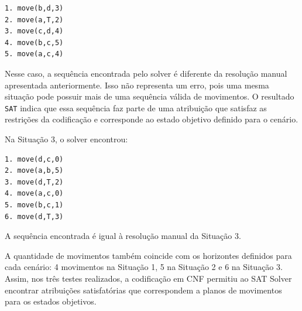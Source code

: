 \documentclass{article}
\begin{document}
\begin{verbatim}
1. move(b,d,3)
2. move(a,T,2)
3. move(c,d,4)
4. move(b,c,5)
5. move(a,c,4)
\end{verbatim}

Nesse caso, a sequência encontrada pelo solver é diferente da resolução manual apresentada anteriormente. Isso não representa um erro, pois uma mesma situação pode possuir mais de uma sequência válida de movimentos. O resultado \texttt{SAT} indica que essa sequência faz parte de uma atribuição que satisfaz as restrições da codificação e corresponde ao estado objetivo definido para o cenário.

Na Situação 3, o solver encontrou:

\begin{verbatim}
1. move(d,c,0)
2. move(a,b,5)
3. move(d,T,2)
4. move(a,c,0)
5. move(b,c,1)
6. move(d,T,3)
\end{verbatim}

A sequência encontrada é igual à resolução manual da Situação 3.

A quantidade de movimentos também coincide com os horizontes definidos para cada cenário: 4 movimentos na Situação 1, 5 na Situação 2 e 6 na Situação 3. Assim, nos três testes realizados, a codificação em CNF permitiu ao SAT Solver encontrar atribuições satisfatórias que correspondem a planos de movimentos para os estados objetivos.
\end{document}
